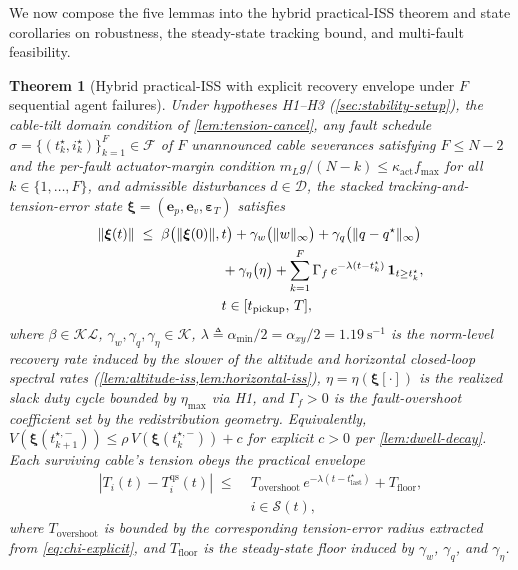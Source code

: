 \documentclass[lettersize,journal]{IEEEtran}
\newtheorem{theorem}{Theorem}%
\newcommand{\vect}[1]{\boldsymbol{#1}}
\begin{document}
We now compose the five lemmas into the hybrid practical-ISS
theorem and state corollaries on robustness, the steady-state
tracking bound, and multi-fault feasibility.

\begin{theorem}[Hybrid practical-ISS with explicit recovery
  envelope under $F$ sequential agent failures]
\label{thm:hybrid-stability}
Under hypotheses H1--H3 (\cref{sec:stability-setup}), the
cable-tilt domain condition of \cref{lem:tension-cancel}, any
fault schedule $\sigma = \{(t_k^\star, i_k^\star)\}_{k=1}^{F}
\in \mathcal{F}$ of $F$ unannounced cable severances satisfying
$F \le N - 2$ and the per-fault actuator-margin condition
$m_L g/(N{-}k) \le \kappa_{\mathrm{act}} f_{\max}$ for all
$k \in \{1,\dots,F\}$, and admissible disturbances
$d \in \mathcal{D}$, the stacked tracking-and-tension-error
state $\vect\xi = (\vect e_p, \vect e_v, \vect\varepsilon_T)$
satisfies
\begin{align}
\label{eq:iss-envelope-explicit}
  \|\vect\xi(t)\|
    \;\le\;
      \beta\bigl(\|\vect\xi(0)\|,\,&t\bigr)
      + \gamma_w\bigl(\|w\|_\infty\bigr)
      + \gamma_q\bigl(\|q - q^\star\|_\infty\bigr)
      \notag \\
    &+ \gamma_\eta\bigl(\eta\bigr)
      + \sum_{k=1}^{F}
           \Gamma_f\,e^{-\lambda(t - t_k^\star)}\,
           \mathbf{1}_{t \ge t_k^\star},\nonumber\\
    &t \in [t_{\mathrm{pickup}},\, T],
\end{align}
where $\beta \in \mathcal{KL}$, $\gamma_w, \gamma_q,
\gamma_\eta \in \mathcal{K}$, $\lambda \triangleq
\alpha_{\min}/2 = \alpha_{xy}/2 = \SI{1.19}{\second^{-1}}$
is the norm-level recovery rate induced by the slower of the
altitude and horizontal closed-loop spectral rates
(\cref{lem:altitude-iss,lem:horizontal-iss}), $\eta =
\eta(\vect\xi[\cdot])$ is the realized slack duty cycle bounded
by $\eta_{\max}$ via H1, and $\Gamma_f > 0$ is the
fault-overshoot coefficient set by the redistribution geometry.
Equivalently, $V(\vect\xi(t_{k+1}^{\star,-})) \le
\rho\,V(\vect\xi(t_k^{\star,-})) + c$ for explicit $c > 0$
per \cref{lem:dwell-decay}. Each surviving cable's tension
obeys the practical envelope
\begin{align}
\label{eq:tension-envelope-thm}
  |T_i(t) - T_i^{\mathrm{qs}}(t)|
    \;\le\;
    &T_{\mathrm{overshoot}}\,
    e^{-\lambda(t - t^\star_{\mathrm{last}})}
    + T_{\mathrm{floor}},\\
    &i \in \mathcal{S}(t),\nonumber
\end{align}
where $T_{\mathrm{overshoot}}$ is bounded by the corresponding
tension-error radius extracted from \eqref{eq:chi-explicit},
and $T_{\mathrm{floor}}$ is the steady-state floor induced by
$\gamma_w$, $\gamma_q$, and $\gamma_\eta$.
\end{theorem}
\end{document}
